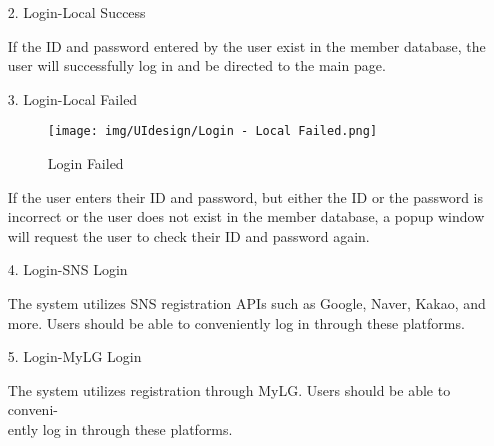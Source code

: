 \documentclass[conference]{IEEEtran}
\begin{document}
\begin{enumerate}
    \item[2.] Login-Local Success

    If the ID and password entered by the user exist in the member database, the user will successfully log in and be directed to the main page. \\
\end{enumerate}

\begin{enumerate}
    \item[3.] Login-Local Failed
    \begin{figure}[h]
\hspace{1.5cm}
\centering
\begin{minipage}{0.4\columnwidth}
    \texttt{[image: img/UIdesign/Login - Local Failed.png]}
    \caption{Login Failed}
\end{minipage}
\end{figure}
    
    If the user enters their ID and password, but either the ID or the password is incorrect or the user does not exist in the member database, a popup window will request the user to check their ID and password again. \\ 
\end{enumerate}

\begin{enumerate}
    \item[4.] Login-SNS Login
    
    The system utilizes SNS registration APIs such as Google, Naver, Kakao, and more. Users should be able to conveniently log in through these platforms. \\ 
\end{enumerate}

\begin{enumerate}
    \item[5.] Login-MyLG Login
    
    The system utilizes registration through MyLG. Users should be able to conveni-\\ently log in through these platforms. \\ 
\end{enumerate}
\end{document}
